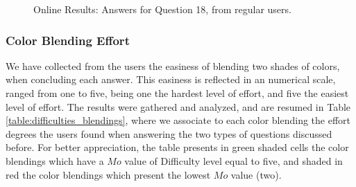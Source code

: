 \begin{figure}[!htbp]
\begin{minipage}{0.48\textwidth}
    \caption[Online Results: Answers for Question 18, from regular users.]{Online Results: Answers for Question 18, from regular users.}
    \label{fig:yellowblend_2}
  \end{minipage}
\end{figure}
%
\subsubsection{Color Blending Effort}
\label{subsubsec:difficulty_rating}
%
We have collected from the users the easiness of blending two shades of colors, when concluding each answer. This easiness is reflected in an numerical scale, ranged from one to five, being one the hardest level of effort, and five the easiest level
of effort. The results were gathered and analyzed, and are resumed in Table \ref{table:difficulties_blendings}, where we associate to each color blending the effort degrees the users found when answering the two types of questions discussed before.
For better appreciation, the table presents in green shaded cells the color blendings which have a $Mo$ value of Difficulty level equal to five, and shaded in red the color blendings which present the lowest $Mo$ value (two). \par
%
